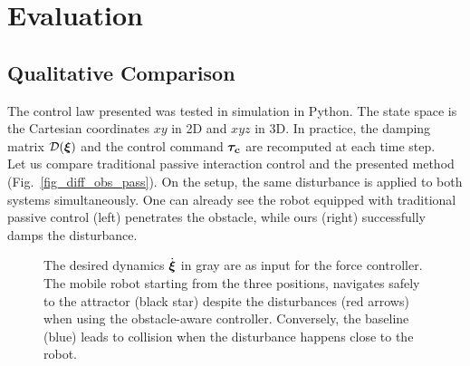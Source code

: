 
\section{Evaluation}  \label{sec:evaluation}

\subsection{Qualitative Comparison} \label{sec:qual_comp}
The control law presented was tested in simulation in Python. The state space is the Cartesian coordinates $xy$ in 2D and $xyz$ in 3D. In practice, the damping matrix $\mathcal{D}(\boldsymbol{\xi})$ and the control command $\boldsymbol{\tau_c}$ are recomputed at each time step.\\

Let us compare traditional passive interaction control and the presented method (Fig.~\ref{fig_diff_obs_pass}). On the setup, the same disturbance is applied to both systems simultaneously. One can already see the robot equipped with traditional passive control (left) penetrates the obstacle, while ours (right) successfully damps the disturbance.


\begin{figure}
  \centering
  \centerline{}
  \caption{The desired dynamics $\dot{\boldsymbol{\xi}}$ in gray are as input for the force controller. 
  The mobile robot starting from the three positions, navigates safely to the attractor (black star) despite the disturbances (red arrows) when using the obstacle-aware controller.
  Conversely, the baseline (blue) leads to collision when the disturbance happens close to the robot.}
  \label{fig:obstacle_aware_damping_comparison}
\end{figure}

